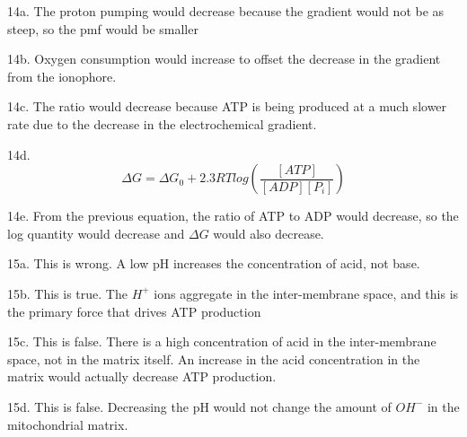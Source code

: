 \documentclass{article}
\begin{document}
14a. The proton pumping would decrease because the gradient would not be as steep, so the pmf would be smaller

14b. Oxygen consumption would increase to offset the decrease in the gradient from the ionophore. 

14c. The ratio would decrease because ATP is being produced at a much slower rate due to the decrease in the electrochemical gradient.

14d. $$\Delta G = \Delta G_0 +2.3RTlog(\frac{[ATP]}{[ADP][P_i]})$$

14e. From the previous equation, the ratio of ATP to ADP would decrease, so the log quantity would decrease and $\Delta G$ would also decrease.

15a. This is wrong. A low pH increases the concentration of acid, not base.

15b. This is true. The $H^+$ ions aggregate in the inter-membrane space, and this is the primary force that drives ATP production 

15c. This is false. There is a high concentration of acid in the inter-membrane space, not in the matrix itself. An increase in the acid concentration in the matrix would actually decrease ATP production. 

15d. This is false. Decreasing the pH would not change the amount of $OH^-$ in the mitochondrial matrix.
\end{document}
